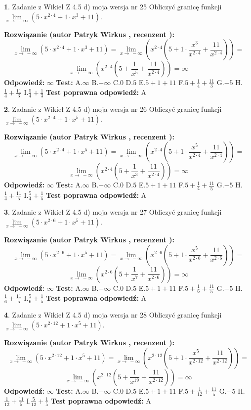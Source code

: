 \documentclass[12pt, a4paper]{article}
\theoremstyle{definition} %
\newtheorem{zad}{}
\newcommand{\zadStart}[1]{\begin{zad}#1\newline}
\newcommand{\zadStop}{\end{zad}}
\newcommand{\rozwStart}[2]{\noindent \textbf{Rozwiązanie (autor #1 , recenzent #2): }\newline}
\newcommand{\rozwStop}{\newline}
\newcommand{\odpStart}{\noindent \textbf{Odpowiedź:}\newline}
\newcommand{\odpStop}{\newline}
\newcommand{\testStart}{\noindent \textbf{Test:}\newline}
\newcommand{\testStop}{\newline}
\newcommand{\kluczStart}{\noindent \textbf{Test poprawna odpowiedź:}\newline}
\newcommand{\kluczStop}{\newline}
\begin{document}
\zadStart{Zadanie z Wikieł Z 4.5 d) moja wersja nr 25}
Obliczyć granicę funkcji  $\lim\limits_{x\to\ -\infty}(5 \cdot x^{2\cdot4}+1 \cdot x^{3}+11)$.
\zadStop
\rozwStart{Patryk Wirkus}{}
$$\lim\limits_{x\to\ -\infty}(5 \cdot x^{2\cdot4}+1 \cdot x^{3}+11) = \lim\limits_{x\to\ -\infty}(x^{2\cdot4}(5 +1 \cdot \frac{x^{3}}{x^{2\cdot4}}+\frac{11}{x^{2\cdot4}})) =$$ $$\lim\limits_{x\to\ -\infty}(x^{2\cdot4}(5 +\frac{1}{x^{5}}+\frac{11}{x^{2\cdot4}})) =\infty$$
\rozwStop
\odpStart
$\infty$
\odpStop
\testStart
A.$\infty$ B.$-\infty$ C.$0$ D.$5$ E.$5 + 1 + 11$
F.$5+\frac{1}{4}+\frac{11}{3}$ G.$-5$
H.$\frac{1}{4}+\frac{11}{3}$
I.$\frac{5}{4}+\frac{1}{3}$
\testStop
\kluczStart
A
\kluczStop



\zadStart{Zadanie z Wikieł Z 4.5 d) moja wersja nr 26}
Obliczyć granicę funkcji  $\lim\limits_{x\to\ -\infty}(5 \cdot x^{2\cdot4}+1 \cdot x^{5}+11)$.
\zadStop
\rozwStart{Patryk Wirkus}{}
$$\lim\limits_{x\to\ -\infty}(5 \cdot x^{2\cdot4}+1 \cdot x^{5}+11) = \lim\limits_{x\to\ -\infty}(x^{2\cdot4}(5 +1 \cdot \frac{x^{5}}{x^{2\cdot4}}+\frac{11}{x^{2\cdot4}})) =$$ $$\lim\limits_{x\to\ -\infty}(x^{2\cdot4}(5 +\frac{1}{x^{3}}+\frac{11}{x^{2\cdot4}})) =\infty$$
\rozwStop
\odpStart
$\infty$
\odpStop
\testStart
A.$\infty$ B.$-\infty$ C.$0$ D.$5$ E.$5 + 1 + 11$
F.$5+\frac{1}{4}+\frac{11}{5}$ G.$-5$
H.$\frac{1}{4}+\frac{11}{5}$
I.$\frac{5}{4}+\frac{1}{5}$
\testStop
\kluczStart
A
\kluczStop



\zadStart{Zadanie z Wikieł Z 4.5 d) moja wersja nr 27}
Obliczyć granicę funkcji  $\lim\limits_{x\to\ -\infty}(5 \cdot x^{2\cdot6}+1 \cdot x^{5}+11)$.
\zadStop
\rozwStart{Patryk Wirkus}{}
$$\lim\limits_{x\to\ -\infty}(5 \cdot x^{2\cdot6}+1 \cdot x^{5}+11) = \lim\limits_{x\to\ -\infty}(x^{2\cdot6}(5 +1 \cdot \frac{x^{5}}{x^{2\cdot6}}+\frac{11}{x^{2\cdot6}})) =$$ $$\lim\limits_{x\to\ -\infty}(x^{2\cdot6}(5 +\frac{1}{x^{7}}+\frac{11}{x^{2\cdot6}})) =\infty$$
\rozwStop
\odpStart
$\infty$
\odpStop
\testStart
A.$\infty$ B.$-\infty$ C.$0$ D.$5$ E.$5 + 1 + 11$
F.$5+\frac{1}{6}+\frac{11}{5}$ G.$-5$
H.$\frac{1}{6}+\frac{11}{5}$
I.$\frac{5}{6}+\frac{1}{5}$
\testStop
\kluczStart
A
\kluczStop



\zadStart{Zadanie z Wikieł Z 4.5 d) moja wersja nr 28}
Obliczyć granicę funkcji  $\lim\limits_{x\to\ -\infty}(5 \cdot x^{2\cdot12}+1 \cdot x^{5}+11)$.
\zadStop
\rozwStart{Patryk Wirkus}{}
$$\lim\limits_{x\to\ -\infty}(5 \cdot x^{2\cdot12}+1 \cdot x^{5}+11) = \lim\limits_{x\to\ -\infty}(x^{2\cdot12}(5 +1 \cdot \frac{x^{5}}{x^{2\cdot12}}+\frac{11}{x^{2\cdot12}})) =$$ $$\lim\limits_{x\to\ -\infty}(x^{2\cdot12}(5 +\frac{1}{x^{19}}+\frac{11}{x^{2\cdot12}})) =\infty$$
\rozwStop
\odpStart
$\infty$
\odpStop
\testStart
A.$\infty$ B.$-\infty$ C.$0$ D.$5$ E.$5 + 1 + 11$
F.$5+\frac{1}{12}+\frac{11}{5}$ G.$-5$
H.$\frac{1}{12}+\frac{11}{5}$
I.$\frac{5}{12}+\frac{1}{5}$
\testStop
\kluczStart
A
\kluczStop
\end{document}
